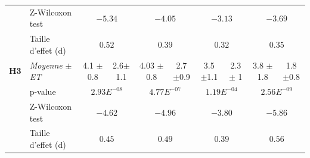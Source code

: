 {\begin{table}
\begin{adjustbox}{angle=90}
\begin{tabular}{|ll|c|c|c|c|c|c|c|c|}
						\newline & \multicolumn{1}{|l|}{Z-Wilcoxon test} & \multicolumn{2}{c|}{ $-5.34$} & \multicolumn{2}{c|}{ $-4.05$} & \multicolumn{2}{c|}{ $-3.13$}& \multicolumn{2}{c|}{ $-3.69$}\\
						\cline{2-10}	
						\newline & \multicolumn{1}{|l|}{Taille d'effet (d)} & \multicolumn{2}{c|}{ $0.52$} & \multicolumn{2}{c|}{ $0.39$} & \multicolumn{2}{c|}{ $0.32$}& \multicolumn{2}{c|}{ $0.35$}\\
						\hline	
						
						\newline \multirow{4}{*} {\textbf{H3}} &\multicolumn{1}{|l|}{ \textit{Moyenne} $\pm$ \textit{ET} } & 4.1 $\pm$ 0.8 & 2.6$\pm$ 1.1 & 4.03 $\pm$ 0.8 & 2.7 $\pm$0.9 &3.5 $\pm$1.1 & 2.3$\pm$ 1 & 3.8 $\pm$ 1.8 & 1.8 $\pm$0.8 \\
						\cline{2-10}	
						\newline & \multicolumn{1}{|l|}{p-value}  & \multicolumn{2}{c|}{ $2.93E^{-08}$} & \multicolumn{2}{c|}{ $4.77E^{-07}$} & \multicolumn{2}{c|}{ $1.19E^{-04}$}& \multicolumn{2}{c|}{ $2.56E^{-09}$}\\
						\cline{2-10}	
						\newline & \multicolumn{1}{|l|}{Z-Wilcoxon test} & \multicolumn{2}{c|}{ $-4.62$} & \multicolumn{2}{c|}{ $-4.96$} & \multicolumn{2}{c|}{ $-3.80$}& \multicolumn{2}{c|}{ $-5.86$}\\
						\cline{2-10}	
						\newline & \multicolumn{1}{|l|}{Taille d'effet (d)} & \multicolumn{2}{c|}{ $0.45$} & \multicolumn{2}{c|}{ $0.49$} & \multicolumn{2}{c|}{ $0.39$}& \multicolumn{2}{c|}{ $0.56$}\\
						\hline	
						

\end{tabular}
\end{adjustbox}
\end{table}}
